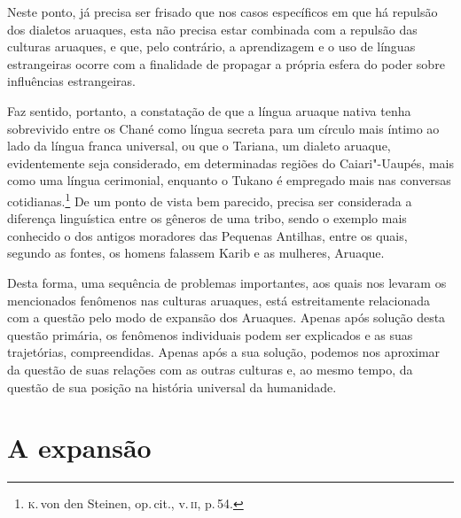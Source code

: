 Neste ponto, já precisa ser frisado que nos casos específicos em que há
repulsão dos dialetos aruaques, esta não precisa estar combinada com a
repulsão das culturas aruaques, e que, pelo contrário, a aprendizagem e o
uso de línguas estrangeiras ocorre com a finalidade de propagar a
própria esfera do poder sobre influências estrangeiras.

Faz sentido, portanto, a constatação de que a língua aruaque nativa tenha sobrevivido entre os Chané
como língua secreta para um círculo mais íntimo ao lado da língua franca universal,
ou que o Tariana, um dialeto aruaque, evidentemente seja considerado, em
determinadas regiões do Caiari"-Uaupés, mais como uma língua cerimonial,
enquanto o Tukano é empregado mais nas conversas cotidianas.\footnote{\textsc{k}.\,von den Steinen, op.\,cit., v.\,\textsc{ii}, p.\,54.} De um ponto de vista bem
parecido, precisa ser considerada a diferença linguística entre os gêneros 
de uma tribo, sendo o exemplo mais conhecido o dos antigos
moradores das Pequenas Antilhas, entre os quais, segundo as fontes, os
homens falassem Karib e as mulheres, Aruaque.

Desta forma, uma sequência de problemas importantes, aos quais nos
levaram os mencionados fenômenos nas culturas aruaques, está
estreitamente relacionada com a questão pelo modo de expansão dos
Aruaques. Apenas após solução desta questão primária, os fenômenos
individuais podem ser explicados e as suas trajetórias, compreendidas.
Apenas após a sua solução, podemos nos aproximar da questão de suas
relações com as outras culturas e, ao mesmo tempo, da questão de sua
posição na história universal da humanidade.


\chapter*{A expansão\smallskip{}}

